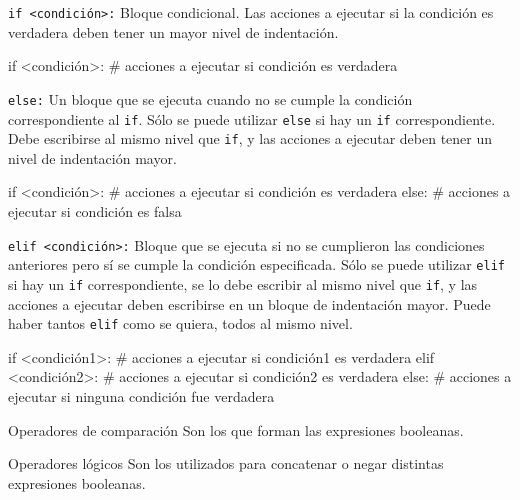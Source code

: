\begin{referencia_python}

\begin{sintaxis}{\lstinline!if <condición>:!}
Bloque condicional.  Las acciones a ejecutar si la condición
es verdadera deben tener un mayor nivel de indentación.
\begin{codigo-python-sn}
if <condición>:
    # acciones a ejecutar si condición es verdadera
\end{codigo-python-sn}
\end{sintaxis}

\begin{sintaxis}{\lstinline!else:!}
Un bloque que se ejecuta cuando no se cumple la condición
correspondiente al \lstinline!if!.  Sólo se puede utilizar
\lstinline!else! si hay un \lstinline!if! correspondiente.  Debe
escribirse al mismo nivel que \lstinline!if!, y las acciones a ejecutar
deben tener un nivel de indentación mayor.
\begin{codigo-python-sn}
if <condición>:
    # acciones a ejecutar si condición es verdadera
else:
    # acciones a ejecutar si condición es falsa
\end{codigo-python-sn}
\end{sintaxis}

\begin{sintaxis}{\lstinline!elif <condición>:!}
Bloque que se ejecuta si no se cumplieron las condiciones
anteriores pero sí se cumple la condición especificada.  Sólo se puede utilizar
\lstinline!elif! si hay un \lstinline!if! correspondiente, se lo debe
escribir al mismo nivel que \lstinline!if!, y las acciones a ejecutar deben
escribirse en un bloque de indentación mayor.  Puede haber tantos
\lstinline!elif! como se quiera, todos al mismo nivel.
\begin{codigo-python-sn}
if <condición1>:
    # acciones a ejecutar si condición1 es verdadera
elif <condición2>:
    # acciones a ejecutar si condición2 es verdadera
else:
    # acciones a ejecutar si ninguna condición fue verdadera
\end{codigo-python-sn}
\end{sintaxis}

\begin{sintaxis}{Operadores de comparación}
Son los que forman las expresiones booleanas.

\tablaComparacion
\end{sintaxis}

\begin{sintaxis}{Operadores lógicos}
Son los utilizados para concatenar o negar distintas expresiones booleanas.

\tablaOperadoresLogicos
\end{sintaxis}

\end{referencia_python}


